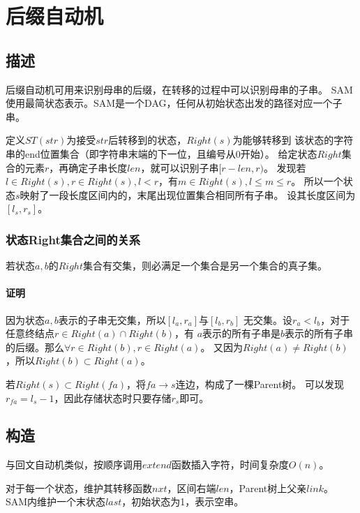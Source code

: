 \section{后缀自动机}
\subsection{描述}
后缀自动机可用来识别母串的后缀，在转移的过程中可以识别母串的子串。
SAM使用最简状态表示。SAM是一个DAG，任何从初始状态出发的路径对应一个子串。

定义$ST(str)$为接受$str$后转移到的状态，$Right(s)$为能够转移到
该状态的字符串的end位置集合（即字符串末端的下一位，且编号从0开始）。
给定状态$Right$集合的元素$r$，再确定子串长度$len$，就可以识别子串$[r-len,r)$。
发现若$l\in Right(s),r\in Right(s),l<r$，有$m\in Right(s),l\leq m \leq r$。
所以一个状态$s$映射了一段长度区间内的，末尾出现位置集合相同所有子串。
设其长度区间为$[l_s,r_s]$。

\subsubsection{状态Right集合之间的关系}
\begin{property}
若状态$a,b$的$Right$集合有交集，则必满足一个集合是另一个集合的真子集。
\end{property}
\paragraph{证明} 因为状态$a,b$表示的子串无交集，所以$[l_a,r_a]$与$[l_b,r_b]$
无交集。设$r_a<l_b$，对于任意终结点$r\in Right(a) \cap Right(b)$，有
$a$表示的所有子串是$b$表示的所有子串的后缀。那么$\forall r\in Right(b),r\in Right(a)$。
又因为$Right(a)\neq Right(b)$，所以$Right(b) \subset Right(a)$。

若$Right(s)\subset Right(fa)$，将$fa\rightarrow s$连边，构成了一棵Parent树。
可以发现$r_{fa}=l_s-1$，因此存储状态时只要存储$r_s$即可。
\subsection{构造}
与回文自动机类似，按顺序调用$extend$函数插入字符，时间复杂度$O(n)$。

对于每一个状态，维护其转移函数$nxt$，区间右端$len$，Parent树上父亲$link$。
SAM内维护一个末状态$last$，初始状态为1，表示空串。

